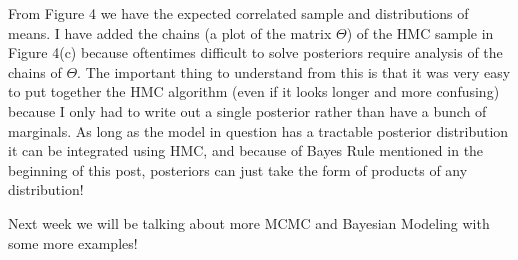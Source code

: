\documentclass[12pt]{article}
\begin{document}
\vspace{5mm}

From Figure 4 we have the expected correlated sample and distributions of means. I have added the chains (a plot of the matrix $\Theta$) of the HMC sample in Figure 4(c) because oftentimes difficult to solve posteriors require analysis of the chains of $\Theta$. The important thing to understand from this is that it was very easy to put together the HMC algorithm (even if it looks longer and more confusing) because I only had to write out a single posterior rather than have a bunch of marginals. As long as the model in question has a tractable posterior distribution it can be integrated using HMC, and because of Bayes Rule mentioned in the beginning of this post, posteriors can just take the form of products of any distribution!

\vspace{5mm}

Next week we will be talking about more MCMC and Bayesian Modeling with some more examples!
\end{document}
